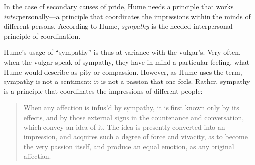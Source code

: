 % 


In the case of secondary causes of pride, Hume needs a principle that works \emph{inter}personally---a principle that coordinates the impressions within the minds of different persons. According to Hume, \emph{sympathy} is the needed interpersonal principle of coordination.

Hume's usage of ``sympathy'' is thus at variance with the vulgar's. Very often, when the vulgar speak of sympathy, they have in mind a particular feeling, what Hume would describe as pity or compassion. However, as Hume uses the term, sympathy is not a sentiment; it is not a passion that one feels. Rather, sympathy is a principle that coordinates the impressions of different people:

\begin{quote}
    When any affection is infus'd by sympathy, it is first known only by its effects, and by those external signs in the countenance and conversation, which convey an idea of it. The idea is presently converted into an impression, and acquires such a degree of force and vivacity, as to become the very passion itself, and produce an equal emotion, as any original affection.
\end{quote}

